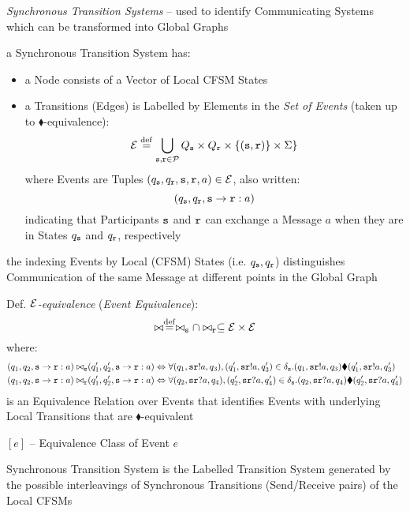 
\emph{Synchronous Transition Systems} -- used to identify
Communicating Systems which can be transformed into Global Graphs

a Synchronous Transition System has:
\begin{itemize}
\item a Node consists of a Vector of Local CFSM States
\item a Transitions (Edges) is Labelled by Elements in the \emph{Set
  of Events} (taken up to $\blacklozenge$-equivalence):
\[
  \mathcal{E} \stackrel{\mathrm{def}}= \bigcup_{\mathtt{s,r\in\mathcal{P}}} Q_\mathtt{s} \times
    Q_\mathtt{r} \times \{(\mathtt{s,r})\} \times \Sigma \}
\]
where Events are Tuples
$(q_\mathtt{s},q_\mathtt{r},\mathtt{s},\mathtt{r},a) \in \mathcal{E}$, also
written:
\[
  (q_\mathtt{s},q_\mathtt{r},\mathtt{s}\rightarrow\mathtt{r}:a)
\]
indicating that Participants $\mathtt{s}$ and $\mathtt{r}$ can exchange
a Message $a$ when they are in States $q_\mathtt{s}$ and $q_\mathtt{r}$,
respectively
\end{itemize}

the indexing Events by Local (CFSM) States (i.e. $q_\mathtt{s},
q_\mathtt{r}$) distinguishes Communication of the same Message at
different points in the Global Graph

Def. \emph{$\mathcal{E}$-equivalence} (\emph{Event Equivalence}):
\[
  \bowtie \stackrel{\mathrm{def}}= \bowtie_\mathtt{s} \cap \bowtie_\mathtt{r}
    \subseteq \mathcal{E} \times \mathcal{E}
\]
where:
\begin{align*}
  (q_1,q_2, \mathtt{s}\rightarrow\mathtt{r} : a) \bowtie_\mathtt{s}&
    (q_1',q_2', \mathtt{s}\rightarrow\mathtt{r} : a) \Leftrightarrow
    \forall(q_1,\mathtt{sr}!a,q_3),(q_1',\mathtt{sr}!a,q_3')
      \in \delta_\mathtt{s}
    . (q_1,\mathtt{sr}!a,q_3)\blacklozenge(q_1',\mathtt{sr}!a,q_3')
  \\
  (q_1,q_2, \mathtt{s}\rightarrow\mathtt{r} : a) \bowtie_\mathtt{r}&
    (q_1',q_2', \mathtt{s}\rightarrow\mathtt{r} : a) \Leftrightarrow
    \forall(q_2,\mathtt{sr}?a,q_4),(q_2',\mathtt{sr}?a,q_4')
      \in \delta_\mathtt{s}
    . (q_2,\mathtt{sr}?a,q_4)\blacklozenge(q_2',\mathtt{sr}?a,q_4')
\end{align*}
is an Equivalence Relation over Events that identifies Events with
underlying Local Transitions that are $\blacklozenge$-equivalent

$[e]$ -- Equivalence Class of Event $e$

Synchronous Transition System is the Labelled Transition System
generated by the possible interleavings of Synchronous Transitions
(Send/Receive pairs) of the Local CFSMs

